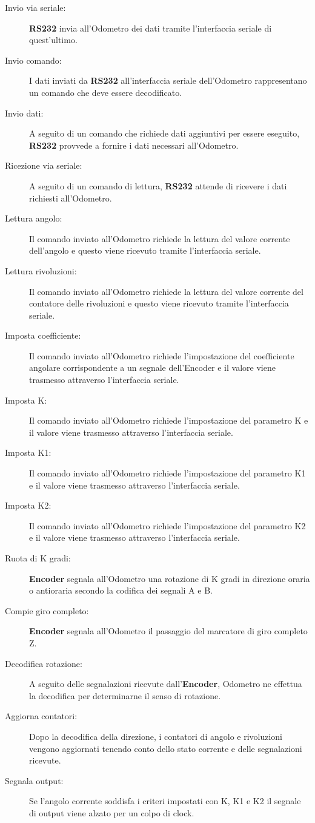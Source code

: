 \documentclass [11pt,a4paper,oneside]{article}
\begin{document}
\begin{description}
\item[Invio via seriale:] \textbf{RS232} invia all'Odometro dei dati tramite l'interfaccia
     seriale di quest'ultimo.
\item[Invio comando:] I dati inviati da \textbf{RS232} all'interfaccia seriale dell'Odometro
     rappresentano un comando che deve essere decodificato.
\item[Invio dati:] A seguito di un comando che richiede dati aggiuntivi per essere
     eseguito, \textbf{RS232} provvede a fornire i dati necessari all'Odometro.
\item[Ricezione via seriale:] A seguito di un comando di lettura, \textbf{RS232} attende di
     ricevere i dati richiesti all'Odometro.
\item[Lettura angolo:] Il comando inviato all'Odometro richiede la lettura del
     valore corrente dell'angolo e questo viene ricevuto tramite l'interfaccia
     seriale.
\item[Lettura rivoluzioni:] Il comando inviato all'Odometro richiede la lettura del
     valore corrente del contatore delle rivoluzioni e questo viene ricevuto
     tramite l'interfaccia seriale.
\item[Imposta coefficiente:] Il comando inviato all'Odometro richiede l'impostazione
     del coefficiente angolare corrispondente a un segnale dell'Encoder e il valore
     viene trasmesso attraverso l'interfaccia seriale.
\item[Imposta K:] Il comando inviato all'Odometro richiede l'impostazione del
     parametro K e il valore viene trasmesso attraverso l'interfaccia seriale.
\item[Imposta K1:] Il comando inviato all'Odometro richiede l'impostazione del
     parametro K1 e il valore viene trasmesso attraverso l'interfaccia seriale.
\item[Imposta K2:] Il comando inviato all'Odometro richiede l'impostazione del
     parametro K2 e il valore viene trasmesso attraverso l'interfaccia seriale.

\item[Ruota di K gradi:] \textbf{Encoder} segnala all'Odometro una rotazione di
     K gradi in direzione oraria o antioraria secondo la codifica dei segnali A e B.
\item[Compie giro completo:] \textbf{Encoder} segnala all'Odometro il passaggio del
     marcatore di giro completo Z.
\item[Decodifica rotazione:] A seguito delle segnalazioni ricevute
     dall'\textbf{Encoder}, Odometro ne effettua la decodifica per determinarne
     il senso di rotazione.
\item[Aggiorna contatori:] Dopo la decodifica della direzione, i contatori di
     angolo e rivoluzioni vengono aggiornati tenendo conto dello stato corrente
     e delle segnalazioni ricevute.
\item[Segnala output:] Se l'angolo corrente soddisfa i criteri impostati con K, 
     K1 e K2 il segnale di output viene alzato per un colpo di clock.
\end{description}
\end{document}
